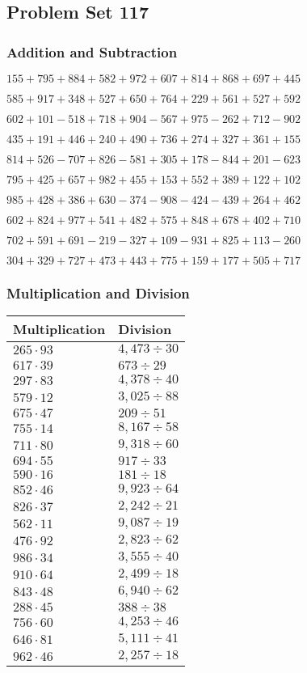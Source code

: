 \hypertarget{problem-set-117}{%
\subsection{Problem Set 117}\label{problem-set-117}}

\hypertarget{addition-and-subtraction}{%
\subsubsection{Addition and
Subtraction}\label{addition-and-subtraction}}

\(155 +795 +884 +582 +972 +607 +814 +868 +697 +445\)

\(585 +917 +348 +527 +650 +764 +229 +561 +527 +592\)

\(602 +101 - 518 +718 +904 - 567 +975 - 262 +712 - 902\)

\(435 +191 +446 +240 +490 +736 +274 +327 +361 +155\)

\(814 +526 - 707 +826 - 581 +305 +178 - 844 +201 - 623\)

\(795 +425 +657 +982 +455 +153 +552 +389 +122 +102\)

\(985 +428 +386 +630 - 374 - 908 - 424 - 439 +264 +462\)

\(602 +824 +977 +541 +482 +575 +848 +678 +402 +710\)

\(702 +591 +691 - 219 - 327 +109 - 931 +825 +113 - 260\)

\(304 +329 +727 +473 +443 +775 +159 +177 +505 +717\)

\hypertarget{multiplication-and-division}{%
\subsubsection{Multiplication and
Division}\label{multiplication-and-division}}

\begin{longtable}[]{@{}ll@{}}
\toprule
Multiplication & Division\tabularnewline
\midrule
\endhead
\(265 \cdot 93\) & \(4,473÷30\)\tabularnewline
\(617 \cdot 39\) & \(673÷29\)\tabularnewline
\(297 \cdot 83\) & \(4,378÷40\)\tabularnewline
\(579 \cdot 12\) & \(3,025÷88\)\tabularnewline
\(675 \cdot 47\) & \(209÷51\)\tabularnewline
\(755 \cdot 14\) & \(8,167÷58\)\tabularnewline
\(711 \cdot 80\) & \(9,318÷60\)\tabularnewline
\(694 \cdot 55\) & \(917÷33\)\tabularnewline
\(590 \cdot 16\) & \(181÷18\)\tabularnewline
\(852 \cdot 46\) & \(9,923÷64\)\tabularnewline
\(826 \cdot 37\) & \(2,242÷21\)\tabularnewline
\(562 \cdot 11\) & \(9,087÷19\)\tabularnewline
\(476 \cdot 92\) & \(2,823÷62\)\tabularnewline
\(986 \cdot 34\) & \(3,555÷40\)\tabularnewline
\(910 \cdot 64\) & \(2,499÷18\)\tabularnewline
\(843 \cdot 48\) & \(6,940÷62\)\tabularnewline
\(288 \cdot 45\) & \(388÷38\)\tabularnewline
\(756 \cdot 60\) & \(4,253÷46\)\tabularnewline
\(646 \cdot 81\) & \(5,111÷41\)\tabularnewline
\(962 \cdot 46\) & \(2,257÷18\)\tabularnewline
\bottomrule
\end{longtable}
